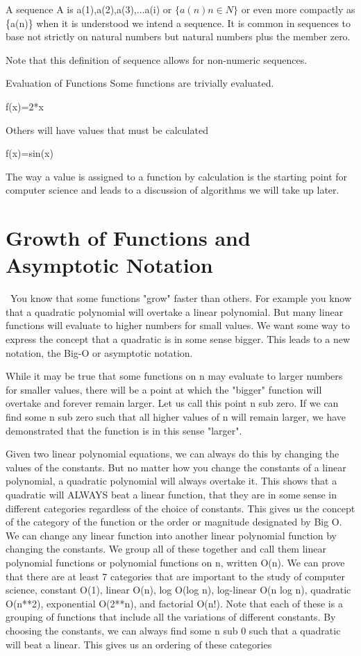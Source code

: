 \documentclass[11pt]{book} %
\theoremstyle {definition}
\theoremstyle {remark}
\begin{document}
A sequence A is a(1),a(2),a(3),...a(i) 
or
$\{a(n) n \in N\}$  or even more compactly as \{a(n)\} when it is understood we intend a sequence. It is common in sequences to base not strictly on natural numbers but natural numbers plus the member zero. 

Note that this definition of sequence allows for non-numeric sequences.









Evaluation of Functions
Some functions are trivially evaluated.

f(x)=2*x

Others will have values that must be calculated

f(x)=sin(x)

The way a value is assigned to a function by calculation is the starting point for computer science and leads to a discussion of algorithms we will take up later.


\section {Growth of Functions and Asymptotic Notation}\
You know that some functions "grow" faster than others. For example you know that a quadratic polynomial will overtake a linear polynomial. But many linear functions will evaluate to higher numbers for small values. We want some way to express the concept that a quadratic is in some sense bigger. This leads to a new notation, the Big-O or asymptotic notation.

While it may be true that some functions on n may evaluate to larger numbers for smaller values, there will be a point at which the "bigger" function will overtake and forever remain larger. Let us call this point n sub zero. If we can find some n sub zero such that all higher values of n will remain larger, we have demonstrated that the function is in this sense "larger".

Given two linear polynomial equations, we can always do this by changing the values of the constants. But no matter how you change the constants of a linear polynomial, a quadratic polynomial will always overtake it. This shows that a quadratic will ALWAYS beat a linear function, that they are in some sense in different categories regardless of the choice of constants. This gives us the concept of the category of the function or the order or magnitude designated by Big O. We can change any linear function into another linear polynomial function by changing the constants. We group all of these together and call them linear polynomial functions or polynomial functions on n, written O(n). We can prove that there are at least 7 categories that are important to the study of computer science, constant O(1), linear O(n), log O(log n), log-linear O(n log n), quadratic O(n**2), exponential O(2**n), and factorial O(n!). Note that each of these is a grouping of functions that include all the variations of different constants. By choosing the constants, we can always find some n sub 0 such that a quadratic will beat a linear. This gives us an ordering of these categories
\end{document}
